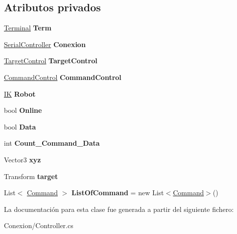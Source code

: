 \subsection*{Atributos privados}
\begin{DoxyCompactItemize}
\item 
\mbox{\label{class_controller_aceff4b20397af9f5d93540b9cd7b450a}} 
\mbox{\hyperlink{class_command_terminal_1_1_terminal}{Terminal}} {\bfseries Term}
\item 
\mbox{\label{class_controller_a2d11d60bd4def767d7b4c97a743a1d2f}} 
\mbox{\hyperlink{class_serial_controller}{Serial\+Controller}} {\bfseries Conexion}
\item 
\mbox{\label{class_controller_a0b9acebc208179483dd1853b3f285bf2}} 
\mbox{\hyperlink{class_target_control}{Target\+Control}} {\bfseries Target\+Control}
\item 
\mbox{\label{class_controller_a7cdb5c0c1303ce30d522aab86ea7647b}} 
\mbox{\hyperlink{class_command_control}{Command\+Control}} {\bfseries Command\+Control}
\item 
\mbox{\label{class_controller_ab0c8e0ad9d428ee4d2e5e319ab89a578}} 
\mbox{\hyperlink{class_i_k}{IK}} {\bfseries Robot}
\item 
\mbox{\label{class_controller_a8cc37c5a29d6e540741ef7142c994450}} 
bool {\bfseries Online}
\item 
\mbox{\label{class_controller_a3fb0a56f70db96f6dcfae1973789ada0}} 
bool {\bfseries Data}
\item 
\mbox{\label{class_controller_a7ef0e63a28bad654d55587785c86de81}} 
int {\bfseries Count\+\_\+\+Command\+\_\+\+Data}
\item 
\mbox{\label{class_controller_a24003f8c7bc50218a0c2e17665acb7b7}} 
Vector3 {\bfseries xyz}
\item 
\mbox{\label{class_controller_a2c11604ccc8cd72224555af8af891828}} 
Transform {\bfseries target}
\item 
\mbox{\label{class_controller_ad900dbfae2bb9097caa6aeba1636030c}} 
List$<$ \mbox{\hyperlink{struct_controller_1_1_command}{Command}} $>$ {\bfseries List\+Of\+Command} = new List$<$\mbox{\hyperlink{struct_controller_1_1_command}{Command}}$>$()
\end{DoxyCompactItemize}


La documentación para esta clase fue generada a partir del siguiente fichero\+:\begin{DoxyCompactItemize}
\item 
Conexion/Controller.\+cs\end{DoxyCompactItemize}
